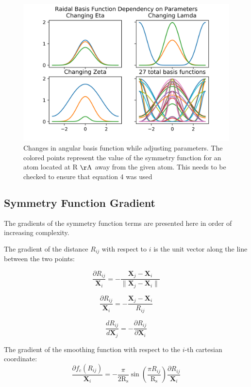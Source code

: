 \documentclass{article}
\newcommand{\mb}[1]{\mathbf{#1}}
\begin{document}
\begin{figure}
	\includegraphics[width=\linewidth]{./img/ang_graphs.png}	\caption{Changes in angular basis function while adjusting parameters. The colored points represent the value of the symmetry function for an atom located at R $\mathrm{\AA}$ away from the given atom. This needs to be checked to ensure that equation 4 was used}
	\label{fig:ang_funcs}
\end{figure}
\newpage
\subsection{Symmetry Function Gradient}
The gradients of the symmetry function terms are presented here in order of increasing complexity.

The gradient of the distance $R_{ij}$ with respect to $i$ is the unit vector along the line between the two points:

\begin{equation}
\frac{\partial R_{ij}}{\mb{X}_{i}} = -\frac{\mathbf{X}_j-\mathbf{X}_i}{\lVert \mathbf{X}_j - \mathbf{X}_i \rVert}
\end{equation}

\begin{equation}
\frac{\partial R_{ij}}{\mb{X}_{i}} = -\frac{\mathbf{X}_j-\mathbf{X}_i}{R_{ij}}
\end{equation}

\begin{equation}
\frac{d R_{ij}}{d \mb{X}_{j}} = - \frac{\partial R_{ij}}{\partial\mb{X}_{i}}
\end{equation}

The gradient of the smoothing function with respect to the ${i}$-th cartesian coordinate:
\begin{equation}
\frac{\partial f_c (R_{ij}) } { \mb{X}_{i}} = -\frac{\pi}{2 
 \mathrm{R_s}}  \sin ( \frac{\pi R_{ij}}{\mathrm{R_s}}) \frac{\partial R_{ij}}{\mb{X}_{i}}
\end{equation}
\end{document}
